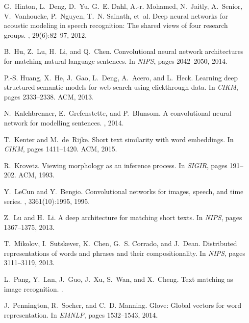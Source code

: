 \documentclass{sig-alternate-05-2015}
\begin{document}
\begin{thebibliography}{10}
G.~Hinton, L.~Deng, D.~Yu, G.~E. Dahl, A.-r. Mohamed, N.~Jaitly, A.~Senior,
  V.~Vanhoucke, P.~Nguyen, T.~N. Sainath, et~al.
\newblock Deep neural networks for acoustic modeling in speech recognition: The
  shared views of four research groups.
, 29(6):82--97, 2012.

B.~Hu, Z.~Lu, H.~Li, and Q.~Chen.
\newblock Convolutional neural network architectures for matching natural
  language sentences.
\newblock In {\em NIPS}, pages 2042--2050, 2014.

P.-S. Huang, X.~He, J.~Gao, L.~Deng, A.~Acero, and L.~Heck.
\newblock Learning deep structured semantic models for web search using
  clickthrough data.
\newblock In {\em CIKM}, pages 2333--2338. ACM, 2013.

N.~Kalchbrenner, E.~Grefenstette, and P.~Blunsom.
\newblock A convolutional neural network for modelling sentences.
, 2014.

T.~Kenter and M.~de~Rijke.
\newblock Short text similarity with word embeddings.
\newblock In {\em CIKM}, pages 1411--1420. ACM, 2015.

R.~Krovetz.
\newblock Viewing morphology as an inference process.
\newblock In {\em SIGIR}, pages 191--202. ACM, 1993.

Y.~LeCun and Y.~Bengio.
\newblock Convolutional networks for images, speech, and time series.
,
  3361(10):1995, 1995.

Z.~Lu and H.~Li.
\newblock A deep architecture for matching short texts.
\newblock In {\em NIPS}, pages 1367--1375, 2013.

T.~Mikolov, I.~Sutskever, K.~Chen, G.~S. Corrado, and J.~Dean.
\newblock Distributed representations of words and phrases and their
  compositionality.
\newblock In {\em NIPS}, pages 3111--3119, 2013.

L.~Pang, Y.~Lan, J.~Guo, J.~Xu, S.~Wan, and X.~Cheng.
\newblock Text matching as image recognition.
.

J.~Pennington, R.~Socher, and C.~D. Manning.
\newblock Glove: Global vectors for word representation.
\newblock In {\em EMNLP}, pages 1532--1543, 2014.


\end{thebibliography}
\end{document}
